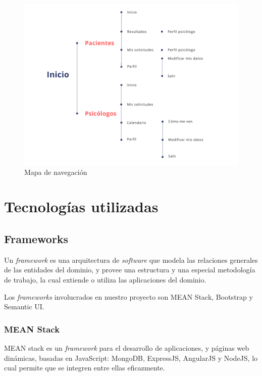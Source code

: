 \begin{figure}[htbp] 
    \centering
    \includegraphics[width=1\textwidth]{figuras/Emozio_Mapa_Navegacion.png}
    \caption{Mapa de navegación}
    \label{fig:map-nav}
\end{figure}	

\section{Tecnologías utilizadas}

\subsection{Frameworks}
Un \textit{framework} es una arquitectura de \textit{software} que modela las relaciones generales de las entidades del dominio, y provee una estructura y una especial metodología de trabajo, la cual extiende o utiliza las aplicaciones del dominio.


Los \textit{frameworks} involucrados en nuestro proyecto son MEAN Stack, Bootstrap y Semantic UI.


\subsubsection{MEAN Stack}
MEAN stack es un \textit{framework} para el desarrollo de aplicaciones, y páginas web dinámicas, basadas en JavaScript: MongoDB, ExpressJS, AngularJS y NodeJS, lo cual permite que se integren entre ellas eficazmente.


